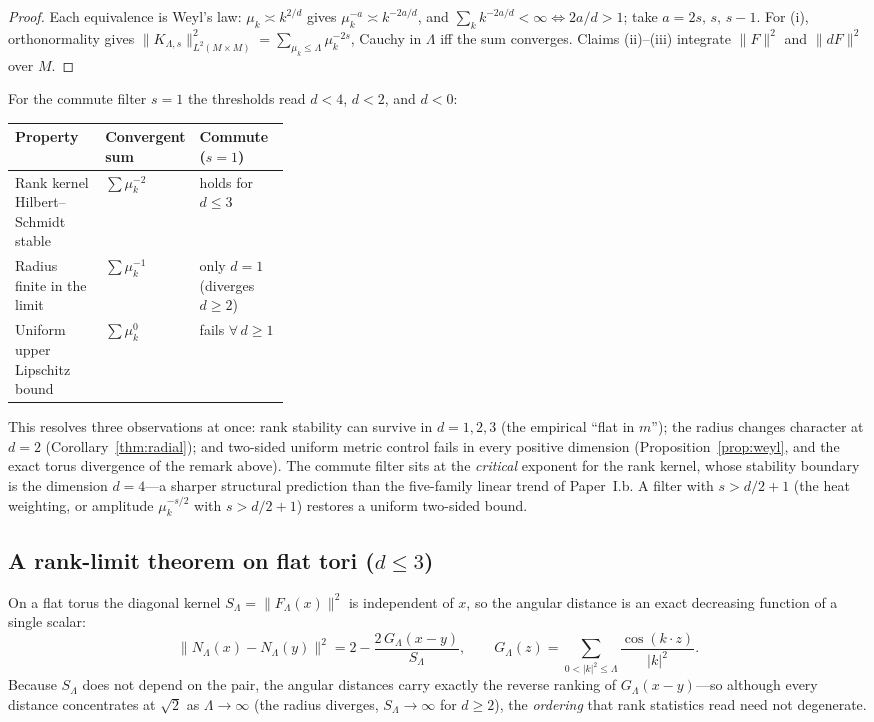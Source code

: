 \documentclass[11pt]{article}
\theoremstyle{remark}
\begin{document}
\begin{proof}
Each equivalence is Weyl's law: $\mu_k\asymp k^{2/d}$ gives $\mu_k^{-a}\asymp k^{-2a/d}$,
and $\sum_k k^{-2a/d}<\infty\iff 2a/d>1$; take $a=2s,\,s,\,s-1$. For (i), orthonormality
gives $\lVert K_{\Lambda,s}\rVert^2_{L^2(M\times M)}=\sum_{\mu_k\le\Lambda}\mu_k^{-2s}$,
Cauchy in $\Lambda$ iff the sum converges. Claims (ii)--(iii) integrate
$\lVert F\rVert^2$ and $\lVert dF\rVert^2$ over $M$.
\end{proof}

\noindent For the commute filter $s=1$ the thresholds read $d<4$, $d<2$, and $d<0$:
\begin{center}\small
\begin{tabular}{@{}lp{0.32\linewidth}l@{}}
\toprule
Property & Convergent sum & Commute ($s=1$) \\
\midrule
Rank kernel Hilbert--Schmidt stable & $\sum\mu_k^{-2}$ & holds for $d\le3$ \\
Radius finite in the limit & $\sum\mu_k^{-1}$ & only $d=1$ (diverges $d\ge2$) \\
Uniform upper Lipschitz bound & $\sum\mu_k^{0}$ & fails $\forall\,d\ge1$ \\
\bottomrule
\end{tabular}
\end{center}
This resolves three observations at once: rank stability can survive in $d=1,2,3$ (the
empirical ``flat in $m$''); the radius changes character at $d=2$
(Corollary~\ref{thm:radial}); and two-sided uniform metric control fails in every
positive dimension (Proposition~\ref{prop:weyl}, and the exact torus divergence of the
remark above). The commute filter sits at the \emph{critical} exponent for the rank
kernel, whose stability boundary is the dimension $d=4$---a sharper structural
prediction than the five-family linear trend of Paper~I.b. A filter with
$s>d/2+1$ (the heat weighting, or amplitude $\mu_k^{-s/2}$ with $s>d/2+1$) restores a
uniform two-sided bound.


\subsection*{A rank-limit theorem on flat tori ($d\le3$)}
On a flat torus the diagonal kernel $S_\Lambda=\lVert F_\Lambda(x)\rVert^2$ is
independent of $x$, so the angular distance is an exact decreasing function of a single
scalar:
\[
\lVert N_\Lambda(x)-N_\Lambda(y)\rVert^2=2-\frac{2\,G_\Lambda(x-y)}{S_\Lambda},
\qquad
G_\Lambda(z)=\sum_{0<\lvert k\rvert^2\le\Lambda}\frac{\cos(k\cdot z)}{\lvert k\rvert^2}.
\]
Because $S_\Lambda$ does not depend on the pair, the angular distances carry exactly
the reverse ranking of $G_\Lambda(x-y)$---so although every distance concentrates at
$\sqrt2$ as $\Lambda\to\infty$ (the radius diverges, $S_\Lambda\to\infty$ for
$d\ge2$), the \emph{ordering} that rank statistics read need not degenerate.
\end{document}
